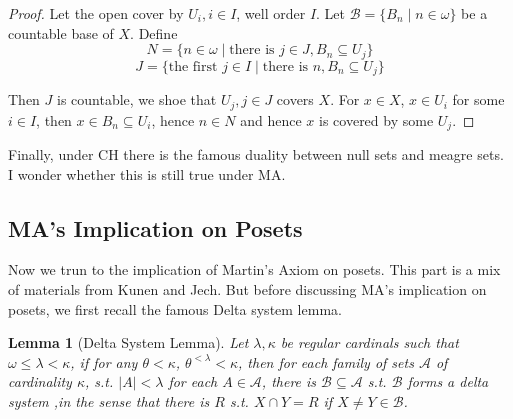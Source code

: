 \documentclass{article}
\newtheorem{lemma}{Lemma}
\begin{document}
\begin{proof}
    Let the open cover by $U_i, i\in I$, well order $I$.
    Let $\mathcal{B} = \{B_n\mid n\in \omega\}$ be a countable base of $X$. Define $$N = \{n\in \omega\mid \text{there is }j\in J, B_n\subseteq U_j\}$$
    $$J = \{\text{the first }j\in I\mid \text{there is }n, B_n\subseteq U_j\}$$

    Then $J$ is countable, we shoe that $U_j,j\in J$ covers $X$. For $x\in X$, $x\in U_i$ for some $i\in I$, then $x\in B_n\subseteq U_i$, hence $n\in N$ and hence $x$ is covered by some $U_j$.
\end{proof}

Finally, under CH there is the famous duality between null sets and meagre sets. I wonder whether this is still true under MA.

\subsection{MA's Implication on Posets}

Now we trun to the implication of Martin's Axiom on posets. This part is a mix of materials from Kunen and Jech. But before discussing MA's implication on posets, we first recall the famous Delta system lemma.

\begin{lemma}[Delta System Lemma]\label{Lem:Delta-system}
    Let $\lambda,\kappa$ be regular cardinals such that $\omega\leq \lambda <\kappa$, if for any $\theta<\kappa$, $\theta^{<\lambda}<\kappa$, then for each family of sets $\mathcal{A}$ of cardinality $\kappa$, s.t. $|A|<\lambda$ for each $A\in \mathcal{A}$, there is $\mathcal{B}\subseteq \mathcal{A}$ s.t. $\mathcal{B}$ forms a delta system ,in the sense that there is $R$ s.t. $X\cap Y = R$ if $X\neq Y\in \mathcal{B}$.
\end{lemma}


\end{document}
